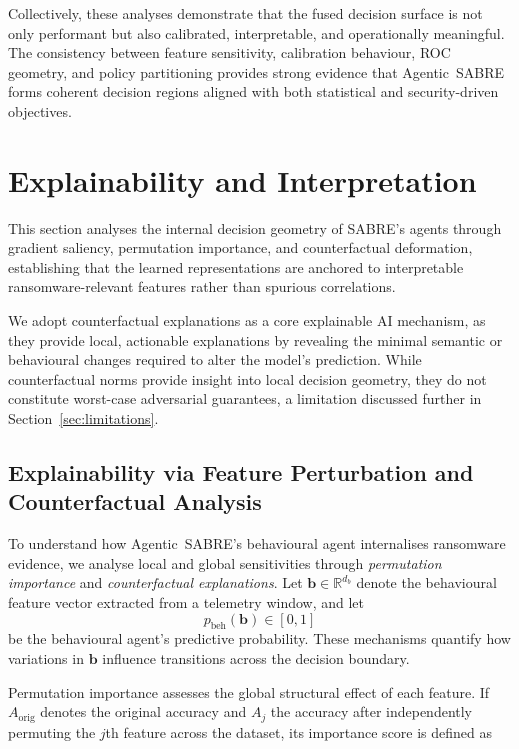 \documentclass[lettersize,journal]{IEEEtran}
\begin{document}
Collectively, these analyses demonstrate that the fused decision surface is not only performant but also calibrated, interpretable, and operationally meaningful. The consistency between feature sensitivity, calibration behaviour, ROC geometry, and policy partitioning provides strong evidence that Agentic~SABRE forms coherent decision regions aligned with both statistical and security-driven objectives.


\section{Explainability and Interpretation}
\label{sec:explainability}

This section analyses the internal decision geometry of SABRE's agents through gradient
saliency, permutation importance, and counterfactual deformation, establishing that the
learned representations are anchored to interpretable ransomware-relevant features rather
than spurious correlations.

We adopt counterfactual explanations as a core explainable AI mechanism, as they provide local, actionable explanations by revealing the minimal semantic or behavioural changes required to alter the model’s prediction. While counterfactual norms provide insight into local decision geometry, they do not constitute worst-case adversarial guarantees, a limitation discussed further in Section~\ref{sec:limitations}.

\subsection{Explainability via Feature Perturbation and Counterfactual Analysis}
\label{sec:behavioural_explainability}

To understand how Agentic~SABRE’s behavioural agent internalises ransomware evidence, we analyse local and global sensitivities through \emph{permutation importance} and \emph{counterfactual explanations}. Let $\mathbf{b}\in\mathbb{R}^{d_b}$ denote the behavioural feature vector extracted from a telemetry window, and let
\begin{equation}
p_{\mathrm{beh}}(\mathbf{b}) \in [0,1]
\label{eq:beh_score}
\end{equation}
be the behavioural agent's predictive probability. These mechanisms quantify how variations in $\mathbf{b}$ influence transitions across the decision boundary.

Permutation importance assesses the global structural effect of each feature. If $A_{\text{orig}}$ denotes the original accuracy and $A_j$ the accuracy after independently permuting the $j$th feature across the dataset, its importance score is defined as
\end{document}
